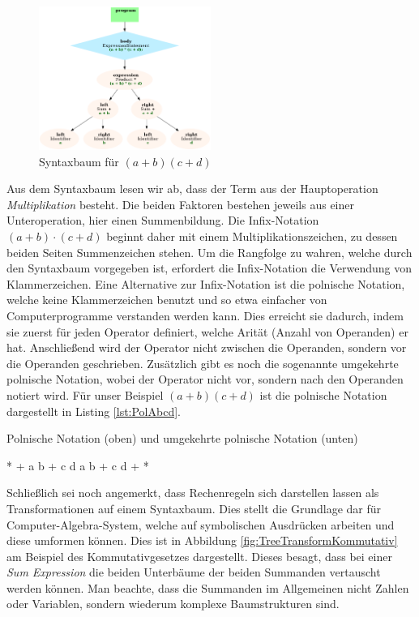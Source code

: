 \begin{figure}[H]
	\caption{Syntaxbaum für $(a+b)(c+d)$}
	\label{fig:JsAbcdBaum}
	\centering
	\includegraphics[width=0.5\textwidth]{./img/js-tree-abcd.png}
\end{figure}

Aus dem Syntaxbaum lesen wir ab, dass der Term aus der Hauptoperation \emph{Multiplikation} besteht. Die beiden Faktoren bestehen jeweils aus einer Unteroperation, hier einen Summenbildung. Die Infix-Notation $(a+b)\cdot(c+d)$ beginnt daher mit einem Multiplikationszeichen, zu dessen beiden Seiten Summenzeichen stehen. Um die Rangfolge zu wahren, welche durch den Syntaxbaum vorgegeben ist, erfordert die Infix-Notation die Verwendung von Klammerzeichen. Eine Alternative zur Infix-Notation ist die polnische Notation, welche keine Klammerzeichen benutzt und so etwa einfacher von Computerprogramme verstanden werden kann. Dies erreicht sie dadurch, indem sie zuerst für jeden Operator definiert, welche Arität (Anzahl von Operanden) er hat. Anschließend wird der Operator nicht zwischen die Operanden, sondern vor die Operanden geschrieben. Zusätzlich gibt es noch die sogenannte umgekehrte polnische Notation, wobei der Operator nicht vor, sondern nach den Operanden notiert wird. Für unser Beispiel $(a+b)(c+d)$ ist die polnische Notation dargestellt in Listing \ref{lst:PolAbcd}.

\begin{listing}[H]
	\caption{Polnische Notation (oben) und umgekehrte polnische Notation (unten)}
	\label{lst:PolAbcd}
\begin{textcode}
* + a b + c d
a b + c d + *
\end{textcode}
\end{listing}

Schließlich sei noch angemerkt, dass Rechenregeln sich darstellen lassen als Transformationen auf einem Syntaxbaum. Dies stellt die Grundlage dar für Computer-Algebra-System, welche auf symbolischen Ausdrücken arbeiten und diese umformen können. Dies ist in Abbildung \ref{fig:TreeTransformKommutativ} am Beispiel des Kommutativgesetzes dargestellt. Dieses besagt, dass bei einer \emph{Sum Expression} die beiden Unterbäume der beiden Summanden vertauscht werden können. Man beachte, dass die Summanden im Allgemeinen nicht Zahlen oder Variablen, sondern wiederum komplexe Baumstrukturen sind.

